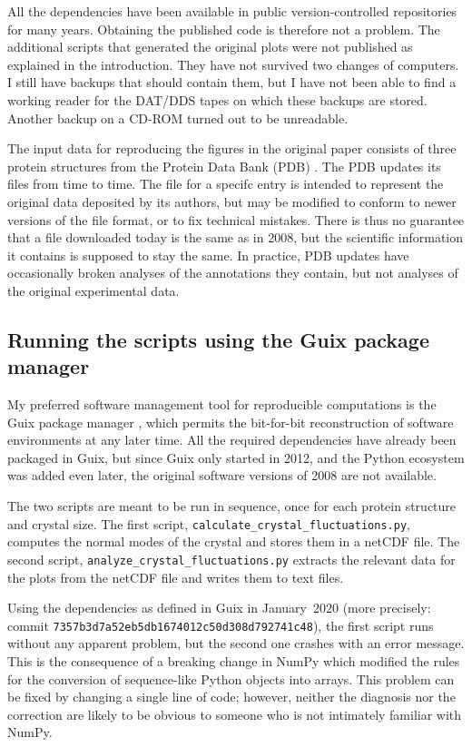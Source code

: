 All the dependencies have been available in public version-controlled repositories for many years. Obtaining the published code is therefore not a problem. The additional scripts that generated the original plots were not published as explained in the introduction. They have not survived two changes of computers. I still have backups that should contain them, but I have not been able to find a working reader for the DAT/DDS tapes on which these backups are stored. Another backup on a CD-ROM turned out to be unreadable.

The input data for reproducing the figures in the original paper consists of three protein structures from the Protein Data Bank (PDB) \cite{wwPDBconsortiumProteinDataBank2019}. The PDB updates its files from time to time. The file for a specifc entry is intended to represent the original data deposited by its authors, but may be modified to conform to newer versions of the file format, or to fix technical mistakes. There is thus no guarantee that a file downloaded today is the same as in 2008, but the scientific information it contains is supposed to stay the same. In practice, PDB updates have occasionally broken analyses of the annotations they contain, but not analyses of the original experimental data.

\subsection*{Running the scripts using the Guix package manager}

My preferred software management tool for reproducible computations is the Guix package manager \cite{CourtesReproducibleUserControlledSoftware2015}, which permits the bit-for-bit reconstruction of software environments at any later time. All the required dependencies have already been packaged in Guix, but since Guix only started in 2012, and the Python ecosystem was added even later, the original software versions of 2008 are not available.

The two scripts are meant to be run in sequence, once for each protein structure and crystal size. The first script, \texttt{calculate\_crystal\_fluctuations.py}, computes the normal modes of the crystal and stores them in a netCDF file. The second script, \texttt{analyze\_crystal\_fluctuations.py} extracts the relevant data for the plots from the netCDF file and writes them to text files.

Using the dependencies as defined in Guix in January~2020 (more precisely: commit \texttt{7357b3d7a52eb5db1674012c50d308d792741c48}), the first script runs without any apparent problem, but the second one crashes with an error message. This is the consequence of a breaking change in NumPy which modified the rules for the conversion of sequence-like Python objects into arrays. This problem can be fixed by changing a single line of code; however, neither the diagnosis nor the correction are likely to be obvious to someone who is not intimately familiar with NumPy.

